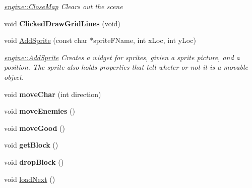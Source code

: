 \begin{DoxyCompactItemize}
\begin{DoxyCompactList}\small\item\em \hyperlink{classengine_a68b46ec574d97c62f29206fd201b34b5}{engine\-::\-Close\-Map} Clears out the scene \end{DoxyCompactList}\item 
\hypertarget{classengine_aff95606d7fa78ddd3f13b0573d8fa284}{void {\bfseries Clicked\-Draw\-Grid\-Lines} (void)}\label{classengine_aff95606d7fa78ddd3f13b0573d8fa284}

\item 
\hypertarget{classengine_a804d510d34deaebcfff0bf5af93568ec}{void \hyperlink{classengine_a804d510d34deaebcfff0bf5af93568ec}{Add\-Sprite} (const char $\ast$sprite\-F\-Name, int x\-Loc, int y\-Loc)}\label{classengine_a804d510d34deaebcfff0bf5af93568ec}

\begin{DoxyCompactList}\small\item\em \hyperlink{classengine_a804d510d34deaebcfff0bf5af93568ec}{engine\-::\-Add\-Sprite} Creates a widget for sprites, givien a sprite picture, and a position. The sprite also holds properties that tell wheter or not it is a movable object. \end{DoxyCompactList}\item 
\hypertarget{classengine_ac084e69968320aa57383fc251f54b887}{void {\bfseries move\-Char} (int direction)}\label{classengine_ac084e69968320aa57383fc251f54b887}

\item 
\hypertarget{classengine_ab27f5792c30dfd6e6cc4fcfd390d15eb}{void {\bfseries move\-Enemies} ()}\label{classengine_ab27f5792c30dfd6e6cc4fcfd390d15eb}

\item 
\hypertarget{classengine_ad010e22061b9a72eb0ff69821ffbfbc6}{void {\bfseries move\-Good} ()}\label{classengine_ad010e22061b9a72eb0ff69821ffbfbc6}

\item 
\hypertarget{classengine_a3fc3e6605e74eb8ba71316b15471a1c3}{void {\bfseries get\-Block} ()}\label{classengine_a3fc3e6605e74eb8ba71316b15471a1c3}

\item 
\hypertarget{classengine_ac37f50e0ee7aa83b113d8e4dbd9ee069}{void {\bfseries drop\-Block} ()}\label{classengine_ac37f50e0ee7aa83b113d8e4dbd9ee069}

\item 
\hypertarget{classengine_a56c6f2331fa2045f184b183c89f9c199}{void \hyperlink{classengine_a56c6f2331fa2045f184b183c89f9c199}{load\-Next} ()}\label{classengine_a56c6f2331fa2045f184b183c89f9c199}


\end{DoxyCompactItemize}
